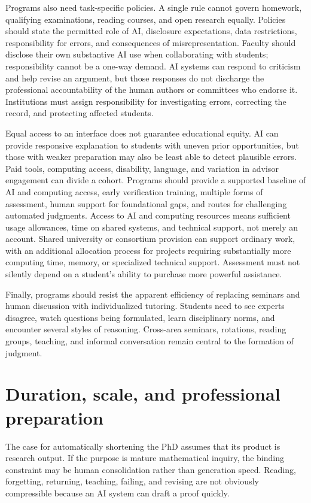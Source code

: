 \documentclass[11pt]{article}
\begin{document}
Programs also need task-specific policies.  A single rule cannot govern homework,
qualifying examinations, reading courses, and open research equally.  Policies should
state the permitted role of AI, disclosure expectations, data restrictions,
responsibility for errors, and consequences of misrepresentation.  Faculty should
disclose their own substantive AI use when collaborating with students; responsibility
cannot be a one-way demand.  AI systems can respond to criticism and help revise an argument, but those
responses do not discharge the professional accountability of the human authors or
committees who endorse it. Institutions must assign responsibility for investigating
errors, correcting the record, and protecting affected students.

Equal access to an interface does not guarantee educational equity.  AI can provide
responsive explanation to students with uneven prior opportunities, but those with weaker
preparation may also be least able to detect plausible errors.  Paid tools, computing
access, disability, language, and variation in advisor engagement can divide a cohort.
Programs should provide a supported baseline of AI and computing access, early
verification training, multiple forms of assessment, human support for foundational gaps,
and routes for challenging automated judgments. Access to AI and computing resources
means sufficient usage allowances, time on shared systems, and technical support, not
merely an account. Shared university or consortium provision can support ordinary work,
with an additional allocation process for projects requiring substantially more
computing time, memory, or specialized technical support. Assessment must not silently depend on a student's ability to purchase
more powerful assistance.

Finally, programs should resist the apparent efficiency of replacing seminars and human
discussion with individualized tutoring.  Students need to see experts disagree, watch
questions being formulated, learn disciplinary norms, and encounter several styles of
reasoning.  Cross-area seminars, rotations, reading groups, teaching, and informal
conversation remain central to the formation of judgment.

\section{Duration, scale, and professional preparation}

The case for automatically shortening the PhD assumes that its product is research
output.  If the purpose is mature mathematical inquiry, the binding constraint may
be human consolidation rather than generation speed.  Reading, forgetting, returning,
teaching, failing, and revising are not obviously compressible because an AI system can draft
a proof quickly.
\end{document}
